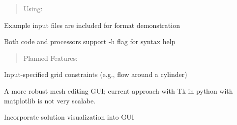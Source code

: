 \begin{quote}
Using\+: \end{quote}

\begin{DoxyItemize}
\item Example input files are included for format demonstration
\item Both code and processors support \textquotesingle{}-\/h\textquotesingle{} flag for syntax help
\end{DoxyItemize}

\begin{quote}
Planned Features\+: \end{quote}

\begin{DoxyItemize}
\item Input-\/specified grid constraints (e.\+g., flow around a cylinder)
\item A more robust mesh editing G\+UI; current approach with Tk in python with matplotlib is not very scalabe.
\item Incorporate solution visualization into G\+UI 
\end{DoxyItemize}
